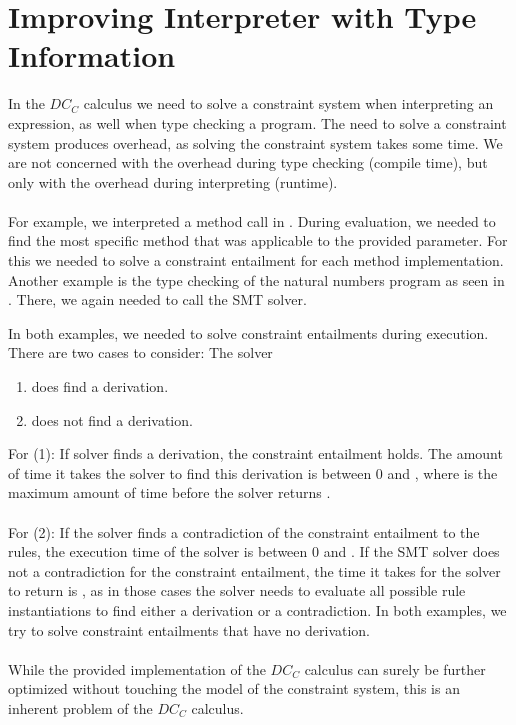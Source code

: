 \chapter{Improving Interpreter with Type Information}
\label{chp:learning}
In the $DC_C$ calculus we need to solve a constraint system
when interpreting an expression, as well when type checking a program.
The need to solve a constraint system produces overhead,
as solving the constraint system takes some time.
We are not concerned with the overhead during type checking (compile time),
but only with the overhead during interpreting (runtime).\\
\\
For example, we interpreted a method call in .
During evaluation, we needed to find the most specific method
that was applicable to the provided parameter.
For this we needed to solve a constraint entailment
for each method implementation.
Another example is the type checking of the natural numbers program
as seen in .
There, we again needed to call the SMT solver.

In both examples, we needed to solve constraint entailments during execution.
There are two cases to consider: The solver
\begin{enumerate}
  \item does find a derivation.
  \item does not find a derivation.
\end{enumerate}
For (1):
If solver finds a derivation,
the constraint entailment holds.
The amount of time it takes the solver to find this derivation
is between $0$ and ,
where  is the maximum amount of time before the solver returns .\\
\\
For (2):
If the solver finds a contradiction of the constraint entailment to the rules,
the execution time of the solver is between $0$ and .
If the SMT solver does not a contradiction for the constraint entailment,
the time it takes for the solver to return is ,
as in those cases the solver needs to evaluate all possible rule instantiations
to find either a derivation or a contradiction.
In both examples, we try to solve constraint entailments that have no derivation.\\
\\
While the provided implementation of the $DC_C$ calculus
can surely be further optimized without
touching the model of the constraint system,
this is an inherent problem of the $DC_C$ calculus.

